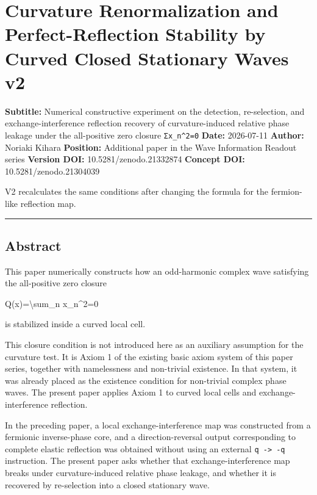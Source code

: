 \documentclass[
  a4paper,
]{article}
\author{}
\date{}
\newenvironment{Shaded}{}{}
\newcommand{\NormalTok}[1]{#1}
\begin{document}
\section{Curvature Renormalization and Perfect-Reflection Stability by
Curved Closed Stationary Waves
v2}\label{curvature-renormalization-and-perfect-reflection-stability-by-curved-closed-stationary-waves-v2}

\textbf{Subtitle:} Numerical constructive experiment on the detection,
re-selection, and exchange-interference reflection recovery of
curvature-induced relative phase leakage under the all-positive zero
closure \texttt{Σx\_n\^{}2=0} \textbf{Date:} 2026-07-11 \textbf{Author:}
Noriaki Kihara \textbf{Position:} Additional paper in the Wave
Information Readout series \textbf{Version DOI:} 10.5281/zenodo.21332874
\textbf{Concept DOI:} 10.5281/zenodo.21304039

V2 recalculates the same conditions after changing the formula for the
fermion-like reflection map.

\begin{center}\rule{0.5\linewidth}{0.5pt}\end{center}

\subsection{Abstract}\label{abstract}

This paper numerically constructs how an odd-harmonic complex wave
satisfying the all-positive zero closure

\begin{Shaded}
\begin{Highlighting}[]
\NormalTok{Q(x)=\textbackslash{}sum\_n x\_n\^{}2=0}
\end{Highlighting}
\end{Shaded}

is stabilized inside a curved local cell.

This closure condition is not introduced here as an auxiliary assumption
for the curvature test. It is Axiom 1 of the existing basic axiom system
of this paper series, together with namelessness and non-trivial
existence. In that system, it was already placed as the existence
condition for non-trivial complex phase waves. The present paper applies
Axiom 1 to curved local cells and exchange-interference reflection.

In the preceding paper, a local exchange-interference map was
constructed from a fermionic inverse-phase core, and a
direction-reversal output corresponding to complete elastic reflection
was obtained without using an external \texttt{q\ -\textgreater{}\ -q}
instruction. The present paper asks whether that exchange-interference
map breaks under curvature-induced relative phase leakage, and whether
it is recovered by re-selection into a closed stationary wave.
\end{document}
